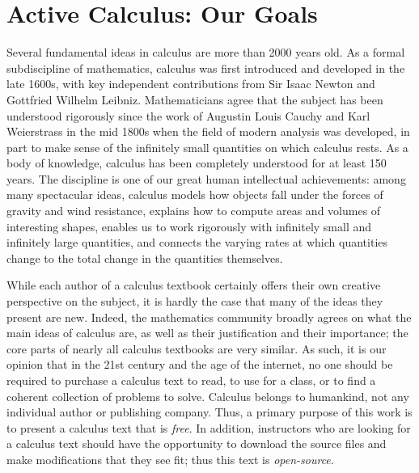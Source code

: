 \documentclass[10pt,]{book}
\theoremstyle{plain}
\theoremstyle{definition}
\theoremstyle{definition}
\theoremstyle{definition}
\theoremstyle{definition}
\numberwithin{equation}{section}
\let\oldchapter\chapter
\renewcommand\chapter{\clearpage\gdef\znewpage{\global\let\znewpage\clearpage}\oldchapter}
\begin{document}
\chapter*{Active Calculus: Our Goals}\label{preface-2}
\hypertarget{p-12}{}%
Several fundamental ideas in calculus are more than 2000 years old. As a formal subdiscipline of mathematics, calculus was first introduced and developed in the late 1600s, with key independent contributions from Sir Isaac Newton and Gottfried Wilhelm Leibniz. Mathematicians agree that the subject has been understood rigorously since the work of Augustin Louis Cauchy and Karl Weierstrass in the mid 1800s when the field of modern analysis was developed, in part to make sense of the infinitely small quantities on which calculus rests. As a body of knowledge, calculus has been completely understood for at least 150 years. The discipline is one of our great human intellectual achievements: among many spectacular ideas, calculus models how objects fall under the forces of gravity and wind resistance, explains how to compute areas and volumes of interesting shapes, enables us to work rigorously with infinitely small and infinitely large quantities, and connects the varying rates at which quantities change to the total change in the quantities themselves.%
\par
\hypertarget{p-13}{}%
While each author of a calculus textbook certainly offers their own creative perspective on the subject, it is hardly the case that many of the ideas they present are new. Indeed, the mathematics community broadly agrees on what the main ideas of calculus are, as well as their justification and their importance; the core parts of nearly all calculus textbooks are very similar. As such, it is our opinion that in the 21st century and the age of the internet, no one should be required to purchase a calculus text to read, to use for a class, or to find a coherent collection of problems to solve. Calculus belongs to humankind, not any individual author or publishing company. Thus, a primary purpose of this work is to present a calculus text that is \emph{free}. In addition, instructors who are looking for a calculus text should have the opportunity to download the source files and make modifications that they see fit; thus this text is \emph{open-source}.%
\end{document}
